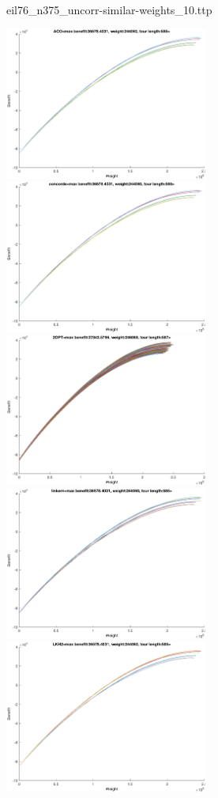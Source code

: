 \documentclass{article}
\begin{document}
\newpage
eil76\_n375\_uncorr-similar-weights\_10.ttp

\noindent
\includegraphics[width=0.5\textwidth]{eil76figs/eil76_n375_uncorr-similar-weights_10.ttp.aco.txt.eps}
\includegraphics[width=0.5\textwidth]{eil76figs/eil76_n375_uncorr-similar-weights_10.ttp.con.txt.eps}
\includegraphics[width=0.5\textwidth]{eil76figs/eil76_n375_uncorr-similar-weights_10.ttp.inv.txt.eps}
\includegraphics[width=0.5\textwidth]{eil76figs/eil76_n375_uncorr-similar-weights_10.ttp.lkh.txt.eps}
\includegraphics[width=0.5\textwidth]{eil76figs/eil76_n375_uncorr-similar-weights_10.ttp.lkh2.txt.eps}
\end{document}
